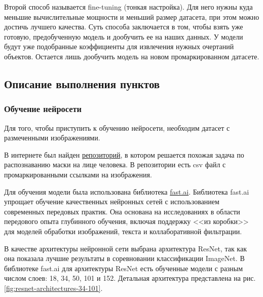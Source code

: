\documentclass[a4paper,14pt]{article}
\begin{document}
	Второй способ называется fine-tuning (тонкая настройка).
	Для него нужны куда меньшие вычислительные мощности и меньший размер датасета, при этом можно достичь лучшего качества.
	Суть способа заключается в том, чтобы взять уже готовую, предобученную модель и дообучить ее на наших данных.
	У модели будут уже подобранные коэффициенты для извлечения нужных очертаний объектов.
	Остается лишь дообучить модель на новом промаркированном датасете.
	
	
	
	
	\subsection{Описание выполнения пунктов}
	
	\subsubsection{Обучение нейросети}
	
	Для того, чтобы приступить к обучению нейросети, необходим датасет с размеченными изображениями.
	
	В интернете был найден \href{https://github.com/UniversalDataTool/coronavirus-mask-image-dataset}{репозиторий}, в котором решается похожая задача по распознаванию маски на лице человека.
	В репозитории есть csv файл с промаркированными ссылками на изображения.
	
	Для обучения модели была использована библиотека \href{https://docs.fast.ai/}{fast.ai}.
	Библиотека fast.ai упрощает обучение качественных нейронных сетей с использованием современных передовых практик.
	Она основана на исследованиях в области передового опыта глубинного обучения, включая поддержку <<из коробки>> для моделей обработки изображений, текста и коллаборативной фильтрации.
	
	В качестве архитектуры нейронной сети выбрана архитектура ResNet, так как она показала лучшие результаты в соревновании классификации ImageNet.
	В библиотеке fast.ai для архитектуры ResNet есть обученные модели с разным числом слоев: 18, 34, 50, 101 и 152.
	Детальная архитектура представлена на рис. \ref{fig:resnet-architectures-34-101}.
	
\end{document}
